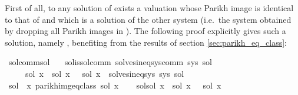 \begin{isabellebody}
\begin{isamarkuptext}
First of all, to any solution  of  exists a valuation whose Parikh image is
identical to that of  and which is a solution of the other system (i.e.\ the system obtained
by dropping all Parikh images in ). The following proof explicitly gives such a solution,
namely , benefiting from the results of section \ref{sec:parikh_eq_class}:%
\end{isamarkuptext}\isamarkuptrue%
\isamarkupfalse%
\ sol{\isacharunderscore}{\kern0pt}comm{\isacharunderscore}{\kern0pt}sol{\isacharcolon}{\kern0pt}\isanewline
\ \ \ sol{\isacharunderscore}{\kern0pt}is{\isacharunderscore}{\kern0pt}sol{\isacharunderscore}{\kern0pt}comm{\isacharcolon}{\kern0pt}\ {\isachardoublequoteopen}solves{\isacharunderscore}{\kern0pt}ineq{\isacharunderscore}{\kern0pt}sys{\isacharunderscore}{\kern0pt}comm\ sys\ sol{\isachardoublequoteclose}\isanewline
\ \ \ \ \ {\isachardoublequoteopen}{\isasymexists}sol{\isacharprime}{\kern0pt}{\isachardot}{\kern0pt}\ {\isacharparenleft}{\kern0pt}{\isasymforall}x{\isachardot}{\kern0pt}\ {\isasymPsi}\ {\isacharparenleft}{\kern0pt}sol\ x{\isacharparenright}{\kern0pt}\ {\isacharequal}{\kern0pt}\ {\isasymPsi}\ {\isacharparenleft}{\kern0pt}sol{\isacharprime}{\kern0pt}\ x{\isacharparenright}{\kern0pt}{\isacharparenright}{\kern0pt}\ {\isasymand}\ solves{\isacharunderscore}{\kern0pt}ineq{\isacharunderscore}{\kern0pt}sys\ sys\ sol{\isacharprime}{\kern0pt}{\isachardoublequoteclose}\isanewline
%
\isadelimproof
%
\endisadelimproof
%
\isatagproof
{}\isamarkupfalse%
\isanewline
\ \ \isamarkupfalse%
\ {\isacharquery}{\kern0pt}sol{\isacharprime}{\kern0pt}\ {\isacharequal}{\kern0pt}\ {\isachardoublequoteopen}{\isasymlambda}x{\isachardot}{\kern0pt}\ {\isasymUnion}{\isacharparenleft}{\kern0pt}parikh{\isacharunderscore}{\kern0pt}img{\isacharunderscore}{\kern0pt}eq{\isacharunderscore}{\kern0pt}class\ {\isacharparenleft}{\kern0pt}sol\ x{\isacharparenright}{\kern0pt}{\isacharparenright}{\kern0pt}{\isachardoublequoteclose}\isanewline
\ \ \isamarkupfalse%
\ sol{\isacharprime}{\kern0pt}{\isacharunderscore}{\kern0pt}sol{\isacharcolon}{\kern0pt}\ {\isachardoublequoteopen}{\isasymforall}x{\isachardot}{\kern0pt}\ {\isasymPsi}\ {\isacharparenleft}{\kern0pt}{\isacharquery}{\kern0pt}sol{\isacharprime}{\kern0pt}\ x{\isacharparenright}{\kern0pt}\ {\isacharequal}{\kern0pt}\ {\isasymPsi}\ {\isacharparenleft}{\kern0pt}sol\ x{\isacharparenright}{\kern0pt}{\isachardoublequoteclose}\isanewline

\end{isabellebody}

